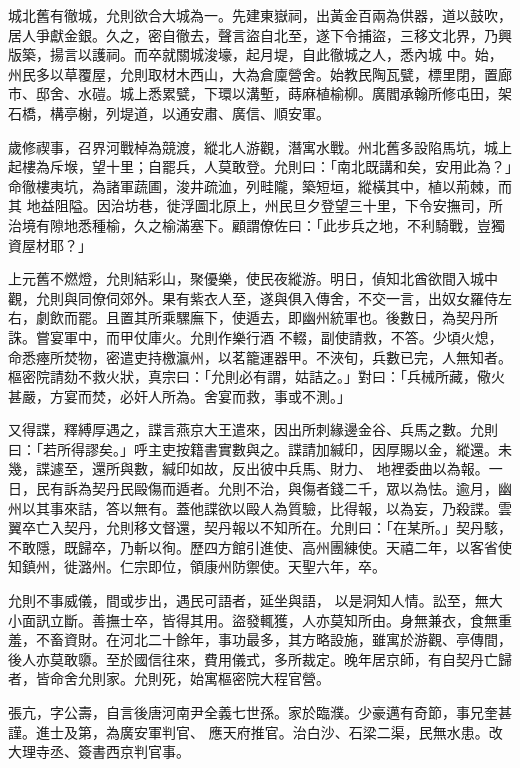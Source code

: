 \begin{pinyinscope}
 城北舊有徹城，允則欲合大城為一。先建東嶽祠，出黃金百兩為供器，道以鼓吹，居人爭獻金銀。久之，密自徹去，聲言盜自北至，遂下令捕盜，三移文北界，乃興版築，揚言以護祠。而卒就關城浚壕，起月堤，自此徹城之人，悉內城
 中。始，州民多以草覆屋，允則取材木西山，大為倉廩營舍。始教民陶瓦甓，標里閉，置廊市、邸舍、水磑。城上悉累甓，下環以溝塹，蒔麻植榆柳。廣閻承翰所修屯田，架石橋，構亭榭，列堤道，以通安肅、廣信、順安軍。



 歲修禊事，召界河戰棹為競渡，縱北人游觀，潛寓水戰。州北舊多設陷馬坑，城上起樓為斥堠，望十里；自罷兵，人莫敢登。允則曰：「南北既講和矣，安用此為？」命徹樓夷坑，為諸軍蔬圃，浚井疏洫，列畦隴，築短垣，縱橫其中，植以荊棘，而其
 地益阻隘。因治坊巷，徙浮圖北原上，州民旦夕登望三十里，下令安撫司，所治境有隙地悉種榆，久之榆滿塞下。顧謂僚佐曰：「此步兵之地，不利騎戰，豈獨資屋材耶？」



 上元舊不燃燈，允則結彩山，聚優樂，使民夜縱游。明日，偵知北酋欲間入城中觀，允則與同僚伺郊外。果有紫衣人至，遂與俱入傳舍，不交一言，出奴女羅侍左右，劇飲而罷。且置其所乘騾廡下，使遁去，即幽州統軍也。後數日，為契丹所誅。嘗宴軍中，而甲仗庫火。允則作樂行酒
 不輟，副使請救，不答。少頃火熄，命悉瘞所焚物，密遣吏持檄瀛州，以茗籠運器甲。不浹旬，兵數已完，人無知者。樞密院請劾不救火狀，真宗曰：「允則必有謂，姑詰之。」對曰：「兵械所藏，儆火甚嚴，方宴而焚，必奸人所為。舍宴而救，事或不測。」



 又得諜，釋縛厚遇之，諜言燕京大王遣來，因出所刺緣邊金谷、兵馬之數。允則曰：「若所得謬矣。」呼主吏按籍書實數與之。諜請加緘印，因厚賜以金，縱還。未幾，諜遽至，還所與數，緘印如故，反出彼中兵馬、財力、
 地裡委曲以為報。一日，民有訴為契丹民毆傷而遁者。允則不治，與傷者錢二千，眾以為怯。逾月，幽州以其事來詰，答以無有。蓋他諜欲以毆人為質驗，比得報，以為妄，乃殺諜。雲翼卒亡入契丹，允則移文督還，契丹報以不知所在。允則曰：「在某所。」契丹駭，不敢隱，既歸卒，乃斬以徇。歷四方館引進使、高州團練使。天禧二年，以客省使知鎮州，徙潞州。仁宗即位，領康州防禦使。天聖六年，卒。



 允則不事威儀，間或步出，遇民可語者，延坐與語，
 以是洞知人情。訟至，無大小面訊立斷。善撫士卒，皆得其用。盜發輒獲，人亦莫知所由。身無兼衣，食無重羞，不畜資財。在河北二十餘年，事功最多，其方略設施，雖寓於游觀、亭傳間，後人亦莫敢隳。至於國信往來，費用儀式，多所裁定。晚年居京師，有自契丹亡歸者，皆命舍允則家。允則死，始寓樞密院大程官營。



 張亢，字公壽，自言後唐河南尹全義七世孫。家於臨濮。少豪邁有奇節，事兄奎甚謹。進士及第，為廣安軍判官、
 應天府推官。治白沙、石梁二渠，民無水患。改大理寺丞、簽書西京判官事。




\end{pinyinscope}
